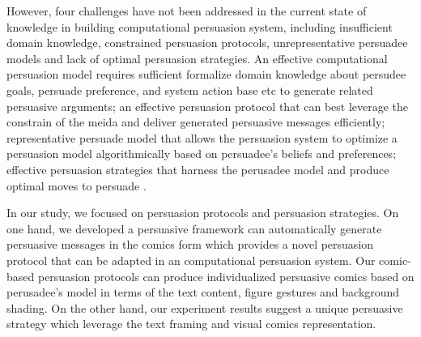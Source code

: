 However, four challenges have not been addressed in the current state of knowledge in building computational persuasion system, including insufficient domain knowledge, constrained persuasion protocols, unrepresentative persuadee models and lack of optimal persuasion strategies\cite{huntertowards}. An effective computational persuasion model requires sufficient formalize domain knowledge about persudee goals, persuade preference, and system action base etc to generate related persuasive arguments; an effective persuasion protocol that can best leverage the constrain of the meida and deliver generated persuasive messages efficiently; representative persuade model that allows the persuasion system to optimize a persuasion model algorithmically based on persuadee's beliefs and preferences; effective persuasion strategies that harness the perusadee model and produce optimal moves to persuade \cite{huntertowards}. \par
In our study, we focused on persuasion protocols and persuasion strategies. On one hand, we developed a persuasive framework can automatically generate persuasive messages in the comics form which provides a novel persuasion protocol that can be adapted in an computational persuasion system. Our comic-based persuasion protocols can produce individualized persuasive comics based on perusadee's model in terms of the text content, figure gestures and background shading. On the other hand, our experiment results suggest a unique persuasive strategy which leverage the text framing and visual comics representation. \par

